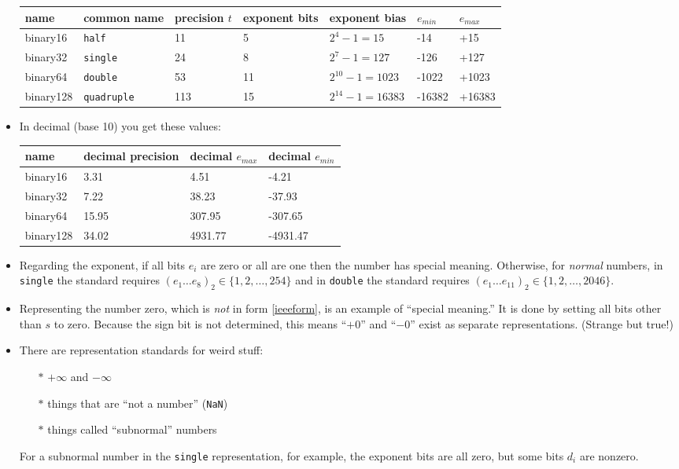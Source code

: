 \documentclass[11pt]{amsart}
\begin{document}
\begin{itemize}
\bigskip
\small
\begin{tabular}{lllllll}
name     & common name & precision $t$ & exponent bits & exponent bias & $e_{min}$ & $e_{max}$ \\ \hline
binary16 &      \texttt{half} & 11 &  5 &      $2^4-1=15$ &   -14 &   +15 \\
binary32 &    \texttt{single} & 24 &  8 &     $2^7-1=127$ &  -126 &  +127 \\
binary64 &    \texttt{double} & 53 & 11 & $2^{10}-1=1023$ & -1022 & +1023 \\
binary128 &\texttt{quadruple} &113 & 15 &$2^{14}-1=16383$ &-16382 &+16383
\end{tabular}
\normalsize
\medskip

\item In decimal (base 10) you get these values:

\bigskip
\small
\begin{tabular}{llll}
name & decimal precision & decimal $e_{max}$ & decimal $e_{min}$ \\ \hline
binary16 & 3.31 & 4.51 & -4.21 \\
binary32 & 7.22 & 38.23 & -37.93 \\
binary64 & 15.95 & 307.95 & -307.65 \\
binary128 & 34.02 & 4931.77 & -4931.47
\end{tabular}
\normalsize
\medskip

\item Regarding the exponent, if all bits $e_i$ are zero or all are one then the number has special meaning.  Otherwise, for \emph{normal} numbers, in \texttt{single} the standard requires $\left(e_1\dots e_8\right)_2 \in \{1,2,\dots,254\}$ and in \texttt{double} the standard requires $\left(e_1\dots e_{11}\right)_2 \in \{1,2,\dots,2046\}$.

\item Representing the number zero, which  is \emph{not} in form \eqref{ieeeform}, is an example of ``special meaning.''  It is done by setting all bits other than $s$ to zero.  Because the sign bit is not determined, this means ``$+0$'' and ``$-0$'' exist as separate representations.  (Strange but true!)

\item There are representation standards for weird stuff:
\begin{itemize}
\item[$\ast$] $+\infty$ and $-\infty$
\item[$\ast$] things that are ``not a number'' (\texttt{NaN})
\item[$\ast$] things called ``subnormal'' numbers
\end{itemize}
For a subnormal number in the \texttt{single} representation, for example, the exponent bits are all zero, but some bits $d_i$ are nonzero.


\end{itemize}
\end{document}
